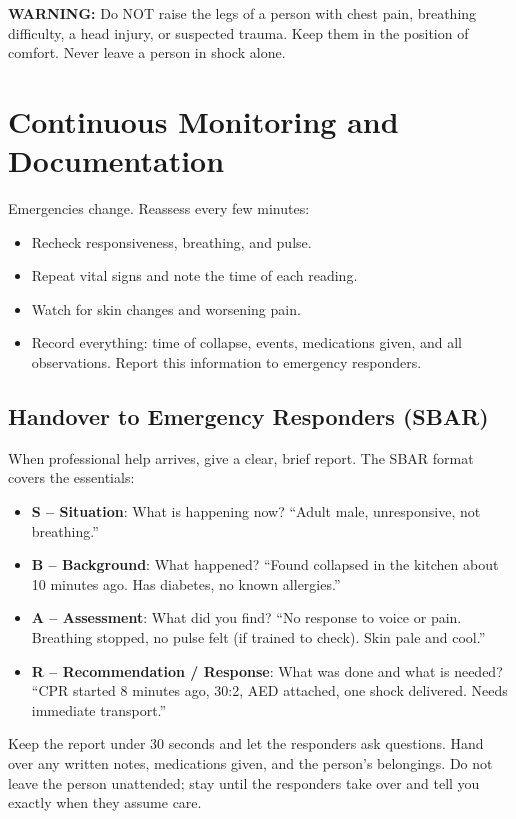 \textbf{WARNING:} Do NOT raise the legs of a person with chest pain, breathing difficulty, a head injury, or suspected trauma. Keep them in the position of comfort. Never leave a person in shock alone.

\section{Continuous Monitoring and Documentation}

Emergencies change. Reassess every few minutes:

\begin{itemize}[leftmargin=*]
\item Recheck responsiveness, breathing, and pulse.
\item Repeat vital signs and note the time of each reading.
\item Watch for skin changes and worsening pain.
\item Record everything: time of collapse, events, medications given, and all observations. Report this information to emergency responders.
\end{itemize}

\subsection{Handover to Emergency Responders (SBAR)}\label{sec:sbar}

When professional help arrives, give a clear, brief report. The SBAR format covers the essentials:

\begin{itemize}[leftmargin=*]
  \item \textbf{S -- Situation}: What is happening now? ``Adult male, unresponsive, not breathing.''
  \item \textbf{B -- Background}: What happened? ``Found collapsed in the kitchen about 10 minutes ago. Has diabetes, no known allergies.''
  \item \textbf{A -- Assessment}: What did you find? ``No response to voice or pain. Breathing stopped, no pulse felt (if trained to check). Skin pale and cool.''
  \item \textbf{R -- Recommendation / Response}: What was done and what is needed? ``CPR started 8 minutes ago, 30:2, AED attached, one shock delivered. Needs immediate transport.''
\end{itemize}

Keep the report under 30 seconds and let the responders ask questions. Hand over any written notes, medications given, and the person's belongings. Do not leave the person unattended; stay until the responders take over and tell you exactly when they assume care.

